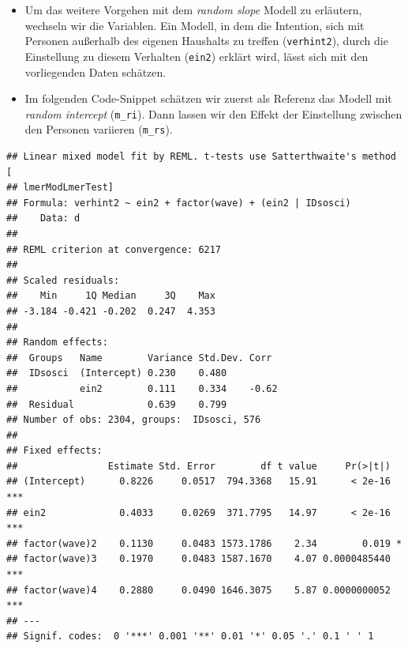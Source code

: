 \documentclass[
]{book}
\newenvironment{Shaded}{\begin{snugshade}}{\end{snugshade}}
\newcommand{\CommentTok}[1]{\textcolor[rgb]{0.56,0.35,0.01}{\textit{#1}}}
\newcommand{\DataTypeTok}[1]{\textcolor[rgb]{0.13,0.29,0.53}{#1}}
\newcommand{\DecValTok}[1]{\textcolor[rgb]{0.00,0.00,0.81}{#1}}
\newcommand{\KeywordTok}[1]{\textcolor[rgb]{0.13,0.29,0.53}{\textbf{#1}}}
\newcommand{\NormalTok}[1]{#1}
\newcommand{\OperatorTok}[1]{\textcolor[rgb]{0.81,0.36,0.00}{\textbf{#1}}}
\newcommand{\OtherTok}[1]{\textcolor[rgb]{0.56,0.35,0.01}{#1}}
\newcommand{\StringTok}[1]{\textcolor[rgb]{0.31,0.60,0.02}{#1}}
\providecommand{\tightlist}{%
  \setlength{\itemsep}{0pt}\setlength{\parskip}{0pt}}
\begin{document}
\begin{itemize}
\tightlist
\item
  Um das weitere Vorgehen mit dem \emph{random slope} Modell zu erläutern, wechseln wir die Variablen. Ein Modell, in dem die Intention, sich mit Personen außerhalb des eigenen Haushalts zu treffen (\texttt{verhint2}), durch die Einstellung zu diesem Verhalten (\texttt{ein2}) erklärt wird, lässt sich mit den vorliegenden Daten schätzen.
\item
  Im folgenden Code-Snippet schätzen wir zuerst als Referenz das Modell mit \emph{random intercept} (\texttt{m\_ri}). Dann lassen wir den Effekt der Einstellung zwischen den Personen variieren (\texttt{m\_rs}).
\end{itemize}

\begin{Shaded}
\end{Shaded}

\begin{verbatim}
## Linear mixed model fit by REML. t-tests use Satterthwaite's method [
## lmerModLmerTest]
## Formula: verhint2 ~ ein2 + factor(wave) + (ein2 | IDsosci)
##    Data: d
## 
## REML criterion at convergence: 6217
## 
## Scaled residuals: 
##    Min     1Q Median     3Q    Max 
## -3.184 -0.421 -0.202  0.247  4.353 
## 
## Random effects:
##  Groups   Name        Variance Std.Dev. Corr 
##  IDsosci  (Intercept) 0.230    0.480         
##           ein2        0.111    0.334    -0.62
##  Residual             0.639    0.799         
## Number of obs: 2304, groups:  IDsosci, 576
## 
## Fixed effects:
##                Estimate Std. Error        df t value     Pr(>|t|)    
## (Intercept)      0.8226     0.0517  794.3368   15.91      < 2e-16 ***
## ein2             0.4033     0.0269  371.7795   14.97      < 2e-16 ***
## factor(wave)2    0.1130     0.0483 1573.1786    2.34        0.019 *  
## factor(wave)3    0.1970     0.0483 1587.1670    4.07 0.0000485440 ***
## factor(wave)4    0.2880     0.0490 1646.3075    5.87 0.0000000052 ***
## ---
## Signif. codes:  0 '***' 0.001 '**' 0.01 '*' 0.05 '.' 0.1 ' ' 1
\end{verbatim}
\end{document}
